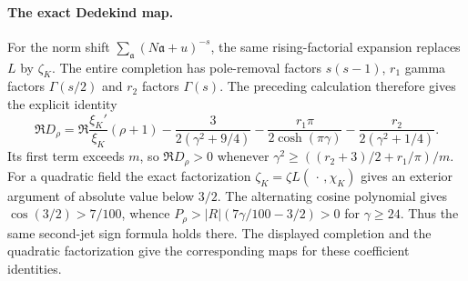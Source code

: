 \paragraph{The exact Dedekind map.}
For the norm shift $\sum_{\mathfrak a}(N\mathfrak a+u)^{-s}$,
the same rising-factorial expansion replaces $L$ by $\zeta_K$.
The entire completion has pole-removal factors $s(s-1)$,
$r_1$ gamma factors $\Gamma(s/2)$ and $r_2$ factors $\Gamma(s)$.
The preceding calculation therefore gives the explicit identity
\[
 \Re D_\rho=\Re\frac{\xi_K'}{\xi_K}(\rho+1)
 -\frac3{2(\gamma^2+9/4)}
 -\frac{r_1\pi}{2\cosh(\pi\gamma)}
 -\frac{r_2}{2(\gamma^2+1/4)}.
\]
Its first term exceeds $m$, so $\Re D_\rho>0$ whenever
$\gamma^2\ge ((r_2+3)/2+r_1/\pi)/m$.
For a quadratic field the exact factorization
$\zeta_K=\zeta L(\,\cdot\,,\chi_K)$ gives an exterior argument
of absolute value below $3/2$. The alternating cosine
polynomial gives $\cos(3/2)>7/100$, whence
$P_\rho>|R|(7\gamma/100-3/2)>0$ for $\gamma\ge24$.
Thus the same second-jet sign formula holds there. The displayed completion and the quadratic factorization
give the corresponding maps for these coefficient identities.
